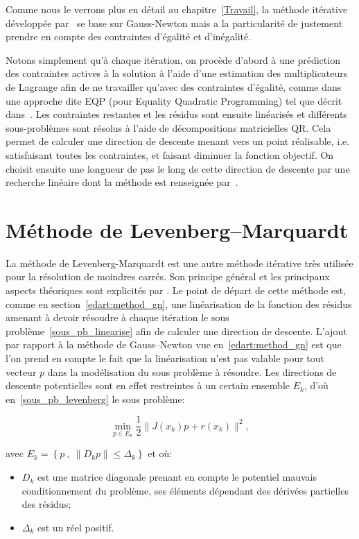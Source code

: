 Comme nous le verrons plus en détail au chapitre~\ref{Travail}, la méthode itérative développée par~\citet{lindwedin88} se base sur Gauss-Newton mais a la particularité 
de justement prendre en compte des contraintes d'égalité et d'inégalité.


Notons simplement qu'à chaque itération, on procède d'abord à une prédiction des contraintes actives à la solution à l'aide d'une estimation des multiplicateurs 
de Lagrange afin de ne travailler qu'avec des contraintes d'égalité, comme dans une approche dite EQP (pour Equality Quadratic Programming) 
tel que décrit dans~\cite{nocewrig99}. Les contraintes restantes et les résidus sont ensuite linéarisés et différents sous-problèmes sont résolus à l'aide de 
décompositions matricielles QR. Cela permet de calculer une direction de descente menant vers un point réalisable, i.e. satisfaisant toutes les contraintes, et faisant diminuer la 
fonction objectif. On choisit ensuite une longueur de pas le long de cette direction de descente par une recherche linéaire dont la méthode est renseignée 
par~\citet{lindstromwedin1984}.


\section{Méthode de Levenberg--Marquardt}\label{method_leven_marq}

La méthode de Levenberg-Marquardt est une autre méthode itérative très utilisée pour la résolution de moindres carrés. Son principe général et les principaux aspects 
théoriques sont explicités par \citet{jjmore78}. Le point de départ de cette méthode est, comme en section~\ref{edart:method_gn}, une linéarisation de la fonction des 
résidus amenant à devoir résoudre à chaque itération le sous problème~\eqref{sous_pb_linearise} afin de calculer une direction de descente. L'ajout par rapport 
à la méthode de Gauss--Newton vue en~\ref{edart:method_gn} est que l'on prend en compte le fait que la linéarisation n'est pas valable pour tout vecteur $p$ dans la 
modélisation du sous problème à résoudre. Les directions de descente potentielles sont en effet restreintes à un certain ensemble $E_k$, 
d'où en~\eqref{sous_pb_levenberg} le sous problème:

\begin{equation}\label{sous_pb_levenberg}
\underset{p\in E_k}{\min} \dfrac{1}{2}\|J(x_k)p + r(x_k)\|^2,
\end{equation}

avec $E_k = \left\{p \ , \ \|D_kp\|\leq \Delta_k\right\}$ et où:
\begin{itemize}
    \item $D_k$ est une matrice diagonale prenant en compte le potentiel mauvais conditionnement du problème, ses éléments dépendant des dérivées partielles des 
    résidus;
    \item $\Delta_k$ est un réel positif.
\end{itemize}

